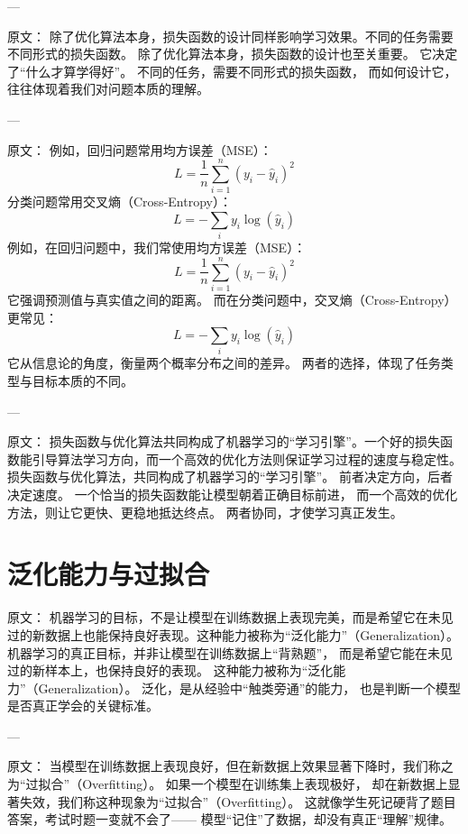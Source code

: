---

原文：
除了优化算法本身，损失函数的设计同样影响学习效果。不同的任务需要不同形式的损失函数。
除了优化算法本身，损失函数的设计也至关重要。  
它决定了“什么才算学得好”。  
不同的任务，需要不同形式的损失函数，  
而如何设计它，往往体现着我们对问题本质的理解。

---

原文：
例如，回归问题常用均方误差（MSE）：
$$
L = \frac{1}{n}\sum_{i=1}^{n}(y_i - \hat{y}_i)^2
$$
分类问题常用交叉熵（Cross-Entropy）：
$$
L = -\sum_{i} y_i \log(\hat{y}_i)
$$
例如，在回归问题中，我们常使用均方误差（MSE）：
$$
L = \frac{1}{n}\sum_{i=1}^{n}(y_i - \hat{y}_i)^2
$$  
它强调预测值与真实值之间的距离。  
而在分类问题中，交叉熵（Cross-Entropy）更常见：
$$
L = -\sum_{i} y_i \log(\hat{y}_i)
$$  
它从信息论的角度，衡量两个概率分布之间的差异。  
两者的选择，体现了任务类型与目标本质的不同。

---

原文：
损失函数与优化算法共同构成了机器学习的“学习引擎”。一个好的损失函数能引导算法学习方向，而一个高效的优化方法则保证学习过程的速度与稳定性。
损失函数与优化算法，共同构成了机器学习的“学习引擎”。  
前者决定方向，后者决定速度。  
一个恰当的损失函数能让模型朝着正确目标前进，  
而一个高效的优化方法，则让它更快、更稳地抵达终点。  
两者协同，才使学习真正发生。

\section{泛化能力与过拟合}

原文：
机器学习的目标，不是让模型在训练数据上表现完美，而是希望它在未见过的新数据上也能保持良好表现。这种能力被称为“泛化能力”（Generalization）。
机器学习的真正目标，并非让模型在训练数据上“背熟题”，  
而是希望它能在未见过的新样本上，也保持良好的表现。  
这种能力被称为“泛化能力”（Generalization）。  
泛化，是从经验中“触类旁通”的能力，  
也是判断一个模型是否真正学会的关键标准。

---

原文：
当模型在训练数据上表现良好，但在新数据上效果显著下降时，我们称之为“过拟合”（Overfitting）。
如果一个模型在训练集上表现极好，  
却在新数据上显著失效，我们称这种现象为“过拟合”（Overfitting）。  
这就像学生死记硬背了题目答案，考试时题一变就不会了——  
模型“记住”了数据，却没有真正“理解”规律。

